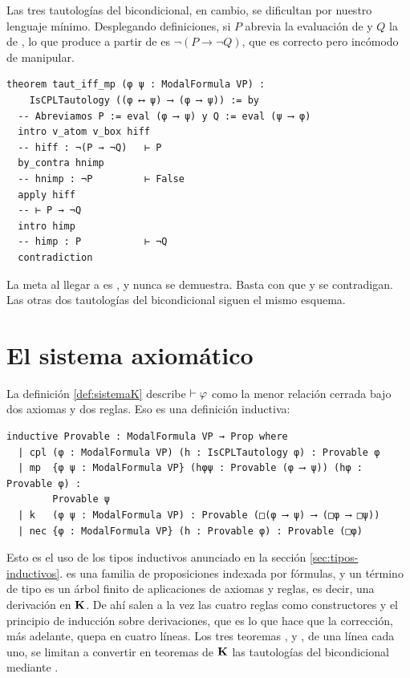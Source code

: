 Las tres tautologías del bicondicional, en cambio, se dificultan por nuestro lenguaje mínimo. Desplegando definiciones, si $P$ abrevia la evaluación de  y $Q$ la de , lo que  produce a partir de  es $\lnot(P \to \lnot Q)$, que es correcto pero incómodo de manipular.

\begin{lstlisting}
theorem taut_iff_mp (φ ψ : ModalFormula VP) :
    IsCPLTautology ((φ ⟷ ψ) ⟶ (φ ⟶ ψ)) := by
  -- Abreviamos P := eval (φ ⟶ ψ) y Q := eval (ψ ⟶ φ)
  intro v_atom v_box hiff
  -- hiff : ¬(P → ¬Q)   ⊢ P
  by_contra hnimp
  -- hnimp : ¬P         ⊢ False
  apply hiff
  -- ⊢ P → ¬Q
  intro himp
  -- himp : P           ⊢ ¬Q
  contradiction
\end{lstlisting}

La meta al llegar a  es , y nunca se demuestra. Basta con que  y  se contradigan. Las otras dos tautologías del bicondicional siguen el mismo esquema.

\section{El sistema axiomático}\label{sec:form-sistema}

La definición \ref{def:sistemaK} describe $\vdash\varphi$ como la menor relación cerrada bajo dos axiomas y dos reglas. Eso es una definición inductiva:

\begin{lstlisting}
inductive Provable : ModalFormula VP → Prop where
  | cpl (φ : ModalFormula VP) (h : IsCPLTautology φ) : Provable φ
  | mp  {φ ψ : ModalFormula VP} (hφψ : Provable (φ ⟶ ψ)) (hφ : Provable φ) :
        Provable ψ
  | k   (φ ψ : ModalFormula VP) : Provable (□(φ ⟶ ψ) ⟶ (□φ ⟶ □ψ))
  | nec {φ : ModalFormula VP} (h : Provable φ) : Provable (□φ)
\end{lstlisting}

Esto es el uso de los tipos inductivos anunciado en la sección \ref{sec:tipos-inductivos}.  es una familia de proposiciones indexada por fórmulas, y un término de tipo  es un árbol finito de aplicaciones de axiomas y reglas, es decir, una derivación en $\mathbf{K}$. De ahí salen a la vez las cuatro reglas como constructores y el principio de inducción sobre derivaciones, que es lo que hace que la corrección, más adelante, quepa en cuatro líneas. Los tres teoremas ,  y , de una línea cada uno, se limitan a convertir en teoremas de $\mathbf{K}$ las tautologías del bicondicional mediante .

